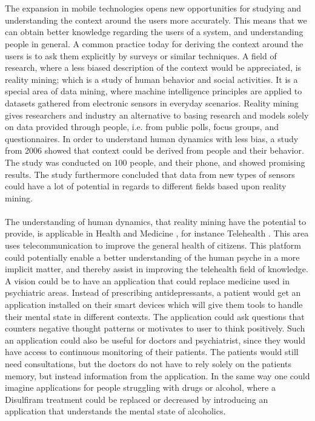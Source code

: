 \\\\
The expansion in mobile technologies opens new opportunities for studying and understanding the context around the users more accurately. This means that we can obtain better knowledge regarding the users of a system, and understanding people in general. A common practice today for deriving the context around the users is to ask them explicitly by surveys or similar techniques. A field of research, where a less biased description of the context would be appreciated, is reality mining; which is a study of human behavior and social activities. It is a special area of data mining, where machine intelligence principles are applied to datasets gathered from electronic sensors in everyday scenarios. Reality mining gives researchers and industry an alternative to basing research and models solely on data provided through people, i.e. from public polls, focus groups, and questionnaires. In order to understand human dynamics with less bias, a study from 2006 \parencite{eagle2006_reality_mining_definition} showed that context could be derived from people and their behavior. The study was conducted on 100 people, and their phone, and showed promising results. The study furthermore concluded that data from new types of sensors could have a lot of potential in regards to different fields based upon reality mining. 
\\\\
The understanding of human dynamics, that reality mining have the potential to provide, is applicable in Health and Medicine \parencite{pentland2009_reality_mining_health_medicine}, for instance Telehealth \parencite{telehealth_aau}. This area uses telecommunication to improve the general health of citizens. This platform could potentially enable a better understanding of the human psyche in a more implicit matter, and thereby assist in improving the telehealth field of knowledge. A vision could be to have an application that could replace medicine used in psychiatric areas. Instead of prescribing antidepressants, a patient would get an application installed on their smart devices which will give them tools to handle their mental state in different contexts. The application could ask questions that counters negative thought patterns or motivates to user to think positively. Such an application could also be useful for doctors and psychiatrist, since they would have access to continuous monitoring of their patients. The patients would still need consultations, but the doctors do not have to rely solely on the patients memory, but instead information from the application. In the same way one could imagine applications for people struggling with drugs or alcohol, where a Disulfiram \parencite{nlm_disulfiram} treatment could be replaced or decreased by introducing an application that understands the mental state of alcoholics.
